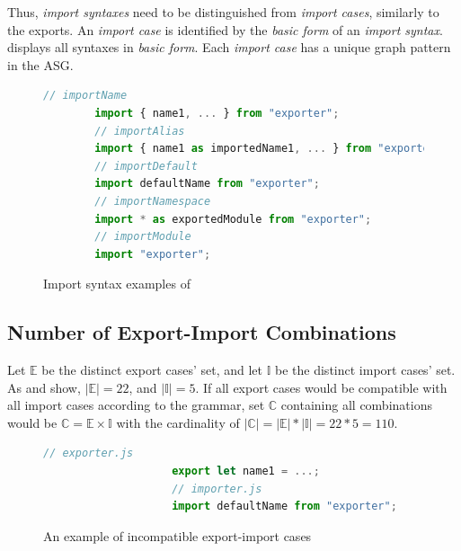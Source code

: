 Thus, \emph{import syntaxes} need to be distinguished from \emph{import cases}, similarly to the exports. An \emph{import case} is identified by the \emph{basic form} of an \emph{import syntax}.  displays all syntaxes in \emph{basic form}. Each \emph{import case} has a unique graph pattern in the ASG.

\begin{figure}[!htb]
	\begin{lstlisting}[language=JavaScript]
		// importName
		import { name1, ... } from "exporter";
		// importAlias
		import { name1 as importedName1, ... } from "exporter";
		// importDefault
		import defaultName from "exporter";
		// importNamespace
		import * as exportedModule from "exporter";
		// importModule
		import "exporter";
	\end{lstlisting}
  \caption{Import syntax examples of }
  \label{fig:import-syntaxes}
\end{figure}


\subsection{Number of Export-Import Combinations}

Let $\mathbb{E}$ be the distinct export cases' set, and let $\mathbb{I}$ be the distinct import cases' set. As  and  show, $|\mathbb{E}| = 22$, and $|\mathbb{I}| = 5$. If all export cases would be compatible with all import cases according to the \es grammar, set $\mathbb{C}$ containing all combinations would be $\mathbb{C} = \mathbb{E} \times \mathbb{I}$ with the cardinality of $|\mathbb{C}| = |\mathbb{E}| * |\mathbb{I}| = 22 * 5 = 110$.

\begin{figure}[!htb]
	\begin{lstlisting}[language=JavaScript]
					// exporter.js
					export let name1 = ...;
					// importer.js
					import defaultName from "exporter";
	\end{lstlisting}
  \caption{An example of incompatible export-import cases}
  \label{fig:incompatible-export-import-example}
\end{figure}

